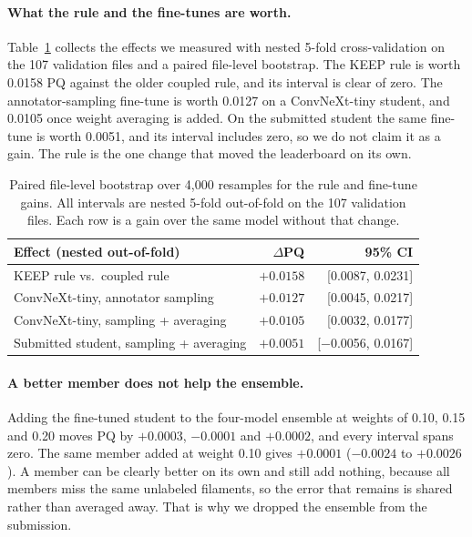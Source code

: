 \documentclass[sigconf]{acmart}
\begin{document}
\paragraph{What the rule and the fine-tunes are worth.}
Table~\ref{tab:ablation} collects the effects we measured with nested 5-fold
cross-validation on the 107 validation files and a paired file-level bootstrap.
The KEEP rule is worth 0.0158 PQ against the older coupled rule, and its interval
is clear of zero. The annotator-sampling fine-tune is worth 0.0127 on a
ConvNeXt-tiny student, and 0.0105 once weight averaging is added. On the
submitted student the same fine-tune is worth 0.0051, and its interval includes
zero, so we do not claim it as a gain. The rule is the one change that moved the
leaderboard on its own.

\begin{table}[t]
\centering
\footnotesize
\setlength{\tabcolsep}{3pt}
\begin{tabular}{@{}lrr@{}}
\toprule
Effect (nested out-of-fold) & $\Delta$PQ & 95\% CI \\
\midrule
KEEP rule vs.\ coupled rule            & $+0.0158$ & [0.0087, 0.0231] \\
ConvNeXt-tiny, annotator sampling      & $+0.0127$ & [0.0045, 0.0217] \\
ConvNeXt-tiny, sampling + averaging    & $+0.0105$ & [0.0032, 0.0177] \\
Submitted student, sampling + averaging & $+0.0051$ & [$-$0.0056, 0.0167] \\
\bottomrule
\end{tabular}
\caption{Paired file-level bootstrap over 4{,}000 resamples for the rule and
fine-tune gains. All intervals are nested 5-fold out-of-fold on the 107
validation files. Each row is a gain over the same model without that change.}
\label{tab:ablation}
\end{table}

\paragraph{A better member does not help the ensemble.}
Adding the fine-tuned student to the four-model ensemble at weights of 0.10,
0.15 and 0.20 moves PQ by $+0.0003$, $-0.0001$ and $+0.0002$, and every interval
spans zero. The same member added at weight 0.10 gives $+0.0001$ ($-0.0024$ to
$+0.0026$). A member can be clearly better on its own and still add nothing,
because all members miss the same unlabeled filaments, so the error that remains
is shared rather than averaged away. That is why we dropped the ensemble from
the submission.
\end{document}
